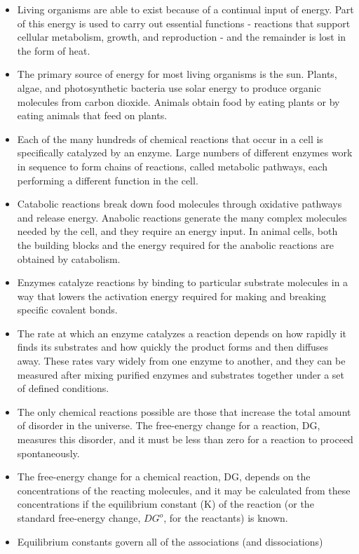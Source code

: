 \begin{itemize}
\item Living organisms are able to exist because of a continual input
of energy. Part of this energy is used to carry out essential functions 
- reactions that support cellular metabolism, growth, and
reproduction - and the remainder is lost in the form of heat.
\item The primary source of energy for most living organisms is the sun.
Plants, algae, and photosynthetic bacteria use solar energy to produce 
organic molecules from carbon dioxide. Animals obtain food by
eating plants or by eating animals that feed on plants.
\item Each of the many hundreds of chemical reactions that occur in a cell
is specifically catalyzed by an enzyme. Large numbers of different
enzymes work in sequence to form chains of reactions, called metabolic 
pathways, each performing a different function in the cell.
\item Catabolic reactions break down food molecules through oxidative 
pathways and release energy. Anabolic reactions generate the
many complex molecules needed by the cell, and they require an
energy input. In animal cells, both the building blocks and the energy
required for the anabolic reactions are obtained by catabolism.
\item Enzymes catalyze reactions by binding to particular substrate molecules 
in a way that lowers the activation energy required for making
and breaking specific covalent bonds.
\item The rate at which an enzyme catalyzes a reaction depends on how
rapidly it finds its substrates and how quickly the product forms and
then diffuses away. These rates vary widely from one enzyme to
another, and they can be measured after mixing purified enzymes
and substrates together under a set of defined conditions.
\item The only chemical reactions possible are those that increase the
total amount of disorder in the universe. The free-energy change for
a reaction, DG, measures this disorder, and it must be less than zero
for a reaction to proceed spontaneously.
\item The free-energy change for a chemical reaction, DG, depends on the
concentrations of the reacting molecules, and it may be calculated
from these concentrations if the equilibrium constant (K) of the reaction 
(or the standard free-energy change, $DG^{o}$, for the reactants) is
known.
\item Equilibrium constants govern all of the associations (and dissociations) 

\end{itemize}
